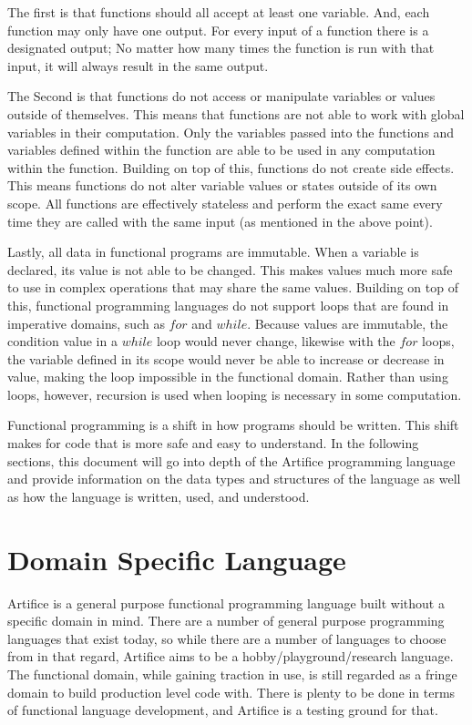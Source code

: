 \documentclass{article}
\begin{document}
The first is that functions should all accept at least one variable. And, each function may only have one
output. For every input of a function there is a designated output; No matter how many times the function is
run with that input, it will always result in the same output.

The Second is that functions do not access or manipulate variables or values outside of themselves. This means
that functions are not able to work with global variables in their computation. Only the variables passed into
the functions and variables defined within the function are able to be used in any computation within the
function. Building on top of this, functions do not create side effects. This means functions do not alter
variable values or states outside of its own scope. All functions are effectively stateless and perform the
exact same every time they are called with the same input (as mentioned in the above point).

Lastly, all data in functional programs are immutable. When a variable is declared, its value is not able to
be changed. This makes values much more safe to use in complex operations that may share the same values. Building
on top of this, functional programming languages do not support loops that are found in imperative domains, such as
$for$ and $while$. Because values are immutable, the condition value in a $while$ loop would never change, likewise with
the $for$ loops, the variable defined in its scope would never be able to increase or decrease in value, making the loop
impossible in the functional domain. Rather than using loops, however, recursion is used when looping is necessary
in some computation.

Functional programming is a shift in how programs should be written. This shift makes for code that is more safe and easy to
understand. In the following sections, this document will go into depth of the Artifice programming language and provide
information on the data types and structures of the language as well as how the language is written, used, and understood.


\section{Domain Specific Language}

Artifice is a general purpose functional programming language built without a specific domain in mind. There are a number of
general purpose programming languages that exist today, so while there are a number of languages to choose from in that regard,
Artifice aims to be a hobby/playground/research language. The functional domain, while gaining traction in use, is still
regarded as a fringe domain to build production level code with. There is plenty to be done in terms of functional language
development, and Artifice is a testing ground for that.
\end{document}
